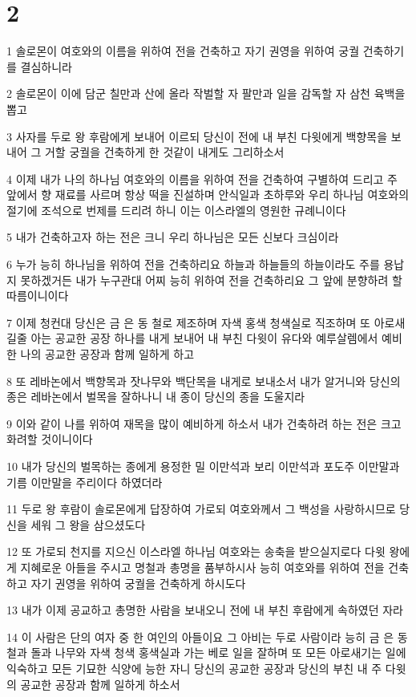 \chapter{2}

\par 1 솔로몬이 여호와의 이름을 위하여 전을 건축하고 자기 권영을 위하여 궁궐 건축하기를 결심하니라
\par 2 솔로몬이 이에 담군 칠만과 산에 올라 작벌할 자 팔만과 일을 감독할 자 삼천 육백을 뽑고
\par 3 사자를 두로 왕 후람에게 보내어 이르되 당신이 전에 내 부친 다윗에게 백향목을 보내어 그 거할 궁궐을 건축하게 한 것같이 내게도 그리하소서
\par 4 이제 내가 나의 하나님 여호와의 이름을 위하여 전을 건축하여 구별하여 드리고 주 앞에서 향 재료를 사르며 항상 떡을 진설하며 안식일과 초하루와 우리 하나님 여호와의 절기에 조석으로 번제를 드리려 하니 이는 이스라엘의 영원한 규례니이다
\par 5 내가 건축하고자 하는 전은 크니 우리 하나님은 모든 신보다 크심이라
\par 6 누가 능히 하나님을 위하여 전을 건축하리요 하늘과 하늘들의 하늘이라도 주를 용납지 못하겠거든 내가 누구관대 어찌 능히 위하여 전을 건축하리요 그 앞에 분향하려 할 따름이니이다
\par 7 이제 청컨대 당신은 금 은 동 철로 제조하며 자색 홍색 청색실로 직조하며 또 아로새길줄 아는 공교한 공장 하나를 내게 보내어 내 부친 다윗이 유다와 예루살렘에서 예비한 나의 공교한 공장과 함께 일하게 하고
\par 8 또 레바논에서 백향목과 잣나무와 백단목을 내게로 보내소서 내가 알거니와 당신의 종은 레바논에서 벌목을 잘하나니 내 종이 당신의 종을 도울지라
\par 9 이와 같이 나를 위하여 재목을 많이 예비하게 하소서 내가 건축하려 하는 전은 크고 화려할 것이니이다
\par 10 내가 당신의 벌목하는 종에게 용정한 밀 이만석과 보리 이만석과 포도주 이만말과 기름 이만말을 주리이다 하였더라
\par 11 두로 왕 후람이 솔로몬에게 답장하여 가로되 여호와께서 그 백성을 사랑하시므로 당신을 세워 그 왕을 삼으셨도다
\par 12 또 가로되 천지를 지으신 이스라엘 하나님 여호와는 송축을 받으실지로다 다윗 왕에게 지혜로운 아들을 주시고 명철과 총명을 품부하시사 능히 여호와를 위하여 전을 건축하고 자기 권영을 위하여 궁궐을 건축하게 하시도다
\par 13 내가 이제 공교하고 총명한 사람을 보내오니 전에 내 부친 후람에게 속하였던 자라
\par 14 이 사람은 단의 여자 중 한 여인의 아들이요 그 아비는 두로 사람이라 능히 금 은 동 철과 돌과 나무와 자색 청색 홍색실과 가는 베로 일을 잘하며 또 모든 아로새기는 일에 익숙하고 모든 기묘한 식양에 능한 자니 당신의 공교한 공장과 당신의 부친 내 주 다윗의 공교한 공장과 함께 일하게 하소서
